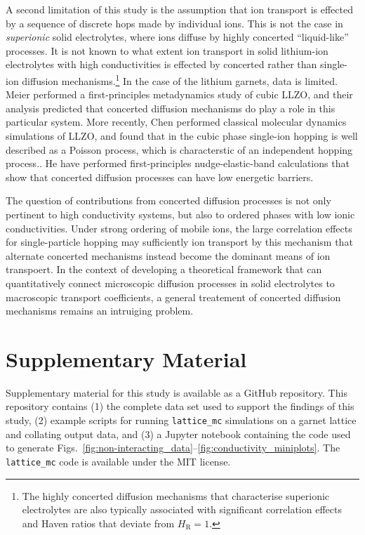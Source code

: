 \documentclass[aps,prb,twocolumn,superscriptaddress,reprint]{revtex4-1}
\begin{document}
A second limitation of this study is the assumption that ion transport is effected by a sequence of discrete hops made by individual ions. This is not the case in \emph{superionic} solid electrolytes,\cite{Catlow_AnnRevMaterSci1986,Hull_RepProgPhys2004} where ions diffuse by highly concerted ``liquid-like'' processes. It is not known to what extent ion transport in solid lithium-ion electrolytes with high conductivities is effected by concerted rather than single-ion diffusion mechanisms.\footnote{The highly concerted diffusion mechanisms that characterise superionic electrolytes are also typically associated with significant correlation effects and Haven ratios that deviate from $H_\mathrm{R}=1$.\cite{SalanneEtAl_JPhysChemC2012,Hull_RepProgPhys2004}} In the case of the lithium garnets, data is limited. Meier \etal performed a first-principles metadynamics study of cubic LLZO, and their analysis predicted that concerted diffusion mechanisms do play a role in this particular system.\cite{MeierEtAl_JPhysChemC2014} More recently, Chen \etal performed classical molecular dynamics simulations of LLZO, and found that in the cubic phase single-ion hopping is well described as a Poisson process,\cite{ChenEtAl_SciRep2017} which is characterstic of an independent hopping process.\cite{MorganAndMadden_PhysRevLett2014}. He \etal have performed first-principles nudge-elastic-band calculations that show that concerted diffusion processes can have low energetic barriers.\cite{HeEtAl_NatureComm2017}

The question of contributions from concerted diffusion processes is not only pertinent to high conductivity systems, but also to ordered phases with low ionic conductivities. Under strong ordering of mobile ions, the large correlation effects for single-particle hopping may sufficiently ion transport by this mechanism that alternate concerted mechanisms instead become the dominant means of ion transpoert.\cite{BurbanoEtAl_PhysRevLett2016,MorganAndMadden_PhysRevLett2014} In the context of developing a theoretical framework that can quantitatively connect microscopic diffusion processes in solid electrolytes to macroscopic transport coefficients, a general treatement of concerted diffusion mechanisms remains an intruiging problem. 

\section{Supplementary Material}
Supplementary material for this study is available as a GitHub repository.\cite{garnet_LGMC_dataset_2017} This repository contains (1) the complete data set used to support the findings of this study, (2) example scripts for running \texttt{lattice\_mc} simulations on a garnet lattice and collating output data, and (3) a Jupyter notebook containing the code used to generate Figs.\ \ref{fig:non-interacting_data}--\ref{fig:conductivity_miniplots}. The \texttt{lattice\_mc} code is available under the MIT license.\cite{Morgan_JOSS2017}
\end{document}
